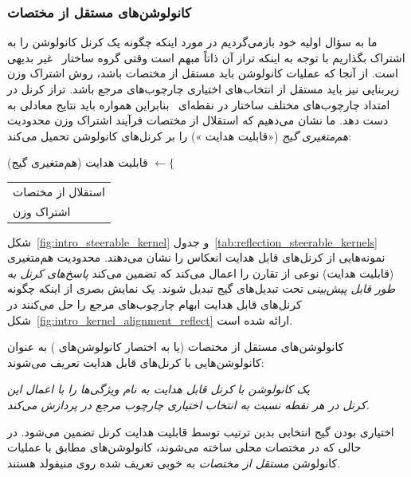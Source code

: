 \subsubsection{کانولوشن‌های مستقل از مختصات }
ما به سؤال اولیه خود بازمی‌گردیم
در مورد اینکه چگونه یک کرنل کانولوشن را به اشتراک بگذاریم با توجه به اینکه تراز آن ذاتاً مبهم است وقتی گروه ساختار~ غیر بدیهی است.
از آنجا که عملیات کانولوشن باید مستقل از مختصات \lr{$\GM$} باشد، روش اشتراک وزن زیربنایی نیز باید مستقل از انتخاب‌های اختیاری چارچوب‌های مرجع باشد.
تراز کرنل در امتداد چارچوب‌های مختلف ساختار  در نقطه‌ای~ بنابراین همواره باید نتایج معادلی به دست دهد.
ما نشان می‌دهیم که استقلال از مختصات \lr{$\GM$} فرآیند اشتراک وزن محدودیت \emph{هم‌متغیری گیج} («قابلیت هدایت ») را بر کرنل‌های کانولوشن تحمیل می‌کند:
\begin{center}
	قابلیت هدایت  (هم‌متغیری گیج) $\longleftarrow \Bigg\{$ 
	\begin{tabular}{l}
		استقلال از مختصات \lr{$\mathcal{G}M$} \\[4pt]
		اشتراک وزن
	\end{tabular}
\end{center}
شکل~\ref{fig:intro_steerable_kernel} و جدول~\ref{tab:reflection_steerable_kernels} نمونه‌هایی از کرنل‌های قابل هدایت انعکاس را نشان می‌دهند.
محدودیت هم‌متغیری (قابلیت هدایت) نوعی از تقارن  را اعمال می‌کند که تضمین می‌کند \emph{پاسخ‌های کرنل به طور قابل پیش‌بینی} تحت تبدیل‌های گیج تبدیل شوند.
یک نمایش بصری از اینکه چگونه کرنل‌های قابل هدایت  ابهام چارچوب‌های مرجع را حل می‌کنند در شکل~\ref{fig:intro_kernel_alignment_reflect} ارائه شده است.


\begin{samepage}
	کانولوشن‌های مستقل از مختصات \lr{$\GM$} (یا به اختصار کانولوشن‌های \lr{$\GM$})
	{\setlength{\marginparwidth}{2.5cm}%
		}%
	به عنوان کانولوشن‌هایی با کرنل‌های قابل هدایت  تعریف می‌شوند:
	\begin{center}\it
		یک کانولوشن \lr{$\GM$} با کرنل قابل هدایت  به نام  ویژگی‌ها را با اعمال این \\
		کرنل در هر نقطه  نسبت به انتخاب اختیاری چارچوب مرجع در \lr{$\GpM$} پردازش می‌کند. \\
	\end{center}
\end{samepage}
اختیاری بودن گیج انتخابی بدین ترتیب توسط قابلیت هدایت  کرنل تضمین می‌شود.
در حالی که در مختصات محلی ساخته می‌شوند، 
کانولوشن‌های \lr{$\GM$} مطابق با عملیات کانولوشن \emph{مستقل از مختصات} به خوبی تعریف شده روی منیفولد هستند.


